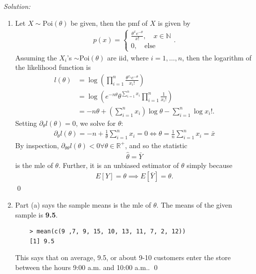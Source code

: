 \documentclass{book}
\theoremstyle{definition}
\newcommand{\p}{\partial}
\newcommand{\nn}{\nonumber}
\newcommand{\Else}{\text{else}}
\newcommand{\f}[2]{\frac{#1}{#2}}
\newcommand{\lp}{\left(}
\newcommand{\rp}{\right)}
\begin{document}
\noindent \textit{Solution:} 
\begin{enumerate}
	\item Let $X \sim \text{Poi}(\theta)$ be given, then the pmf of $X$ is given by
	\begin{align}
	p(x) = \begin{cases}
	\f{\theta^x e^{-\theta}}{x!}, \quad x\in \mathbb{N}\\ 
	0, \quad \Else
	\end{cases}.
	\end{align}
	Assuming the $X_i$'s $\sim \text{Poi}(\theta)$ are iid, where $i=1,\dots,n$, then the logarithm of the likelihood function is 
	\begin{align}
	l(\theta) &= \log \lp \prod^n_{i=1} \f{\theta^{x_i} e^{-\theta}}{x_i!} \rp\nn\\
	&= \log \lp e^{-n\theta}\theta^{\sum_{i=1}^n x_i}  \prod^n_{i=1}\f{1}{x_i!} \rp\nn\\
	&= -n\theta + \lp \sum^n_{i=1}x_i\rp\log \theta - \sum^n_{i=1}\log x_i!. 
	\end{align}
	Setting $\p_\theta l(\theta) = 0$, we solve for $\theta$:
	\begin{align}
	\p_\theta l(\theta) = -n +  \f{1}{\theta}\sum^n_{i=1}x_i = 0 \iff \theta = \f{1}{n}\sum^n_{i=1} x_i = \bar{x}
	\end{align}
	By inspection, $\p_{\theta\theta}l(\theta) < 0 \forall \theta \in \mathbb{R}^+$, and so the statistic
	\begin{align}
	\hat{\theta} = \bar{Y}
	\end{align}
	is the mle of $\theta$. Further, it is an unbiased estimator of $\theta$ simply because
	\begin{align}
	E[Y] =  \theta \implies E[\bar{Y}] = \theta.
	\end{align}
	\qed
	
	
	\item Part (a) says the sample means is the mle of $\theta$. The means of the given sample is \textbf{9.5}.
	\begin{lstlisting}
	> mean(c(9 ,7, 9, 15, 10, 13, 11, 7, 2, 12))
	[1] 9.5
	\end{lstlisting}
	This says that on average, 9.5, or about 9-10 customers enter the store between the hours 9:00 a.m. and 10:00 a.m.. \qed
	
	
	
\end{enumerate}
\end{document}
